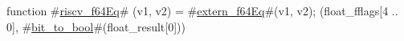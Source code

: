 function #\hyperref[sailRISCVzriscvzyf64Eq]{riscv\_f64Eq}# (v1, v2) = {
  #\hyperref[sailRISCVzexternzyf64Eq]{extern\_f64Eq}#(v1, v2);
  (float_fflags[4 .. 0], #\hyperref[sailRISCVzbitzytozybool]{bit\_to\_bool}#(float_result[0]))
}
